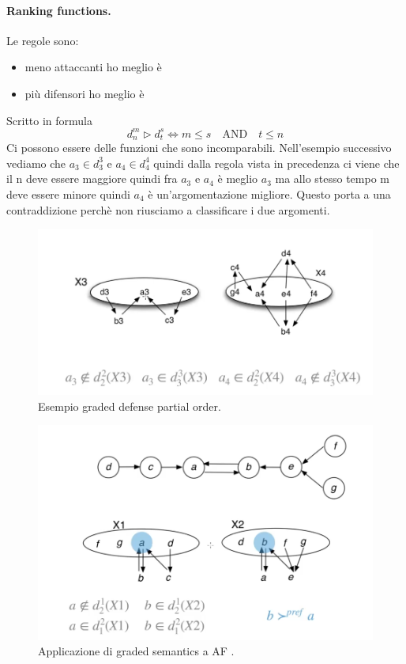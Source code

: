 \paragraph{Ranking functions.} Le regole sono:
\begin{itemize}
    \item meno attaccanti ho meglio è
    \item più difensori ho meglio è
\end{itemize}
Scritto in formula 
\[d_n^m \triangleright  d_t^s \iff m \leq s \quad \text{AND} \quad t \leq n\]
Ci possono essere delle funzioni che sono incomparabili. Nell'esempio successivo vediamo che $a_3 \in d_3^3$ e $a_4 \in d_4^4$ quindi dalla regola vista in precedenza ci viene che il n deve essere maggiore quindi fra $a_3$ e $a_4$ è meglio $a_3$ ma allo stesso tempo m deve essere minore quindi $a_4$ è un'argomentazione migliore. Questo porta a una contraddizione perchè non riusciamo a classificare i due argomenti. 
\begin{figure}[H]
    \centering
    \includegraphics[width=13cm, keepaspectratio]{img/graded_sem_partial_order.png}
    \caption{Esempio graded defense partial order.}\label{fig:es_graded_defense_partial order}
\end{figure}

\begin{figure}[H]
    \centering
    \includegraphics[width=13cm, keepaspectratio]{img/es_fin_graded_semantics.png}
    \caption{Applicazione di graded semantics a AF .}\label{fig:es_fin_graded_semantics}
\end{figure}
